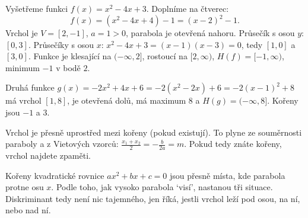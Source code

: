 \begin{example}
  Vyšetřeme funkci $f(x) = x^2 - 4x + 3$. Doplníme na čtverec:
  \begin{equation*}
    f(x) = (x^2 - 4x + 4) - 1 = {(x - 2)}^2 - 1.
  \end{equation*}
  Vrchol je $V = [2, -1]$, $a = 1 > 0$, parabola je otevřená nahoru. Průsečík s osou $y$: $[0, 3]$. Průsečíky s osou $x$: $x^2 - 4x + 3 = (x - 1)(x - 3) = 0$, tedy $[1, 0]$ a $[3, 0]$. Funkce je klesající na $(-\infty, 2]$, rostoucí na $[2, \infty)$, $H(f) = [-1, \infty)$, minimum $-1$ v bodě $2$.

  Druhá funkce $g(x) = -2x^2 + 4x + 6 = -2(x^2 - 2x) + 6 = -2{(x - 1)}^2 + 8$ má vrchol $[1, 8]$, je otevřená dolů, má maximum $8$ a $H(g) = (-\infty, 8]$. Kořeny jsou $-1$ a $3$.
  \begin{center}
  \end{center}
\end{example}

\begin{note}
  Vrchol je přesně uprostřed mezi kořeny (pokud existují). To plyne ze souměrnosti paraboly a z Vietových vzorců: $\frac{x_1 + x_2}{2} = -\frac{b}{2a} = m$. Pokud tedy znáte kořeny, vrchol najdete zpaměti.
\end{note}

Kořeny kvadratické rovnice $ax^2 + bx + c = 0$ jsou přesně místa, kde parabola protne osu $x$. Podle toho, jak vysoko parabola `visí', nastanou tři situace. Diskriminant tedy není nic tajemného, jen říká, jestli vrchol leží pod osou, na ní, nebo nad ní.

